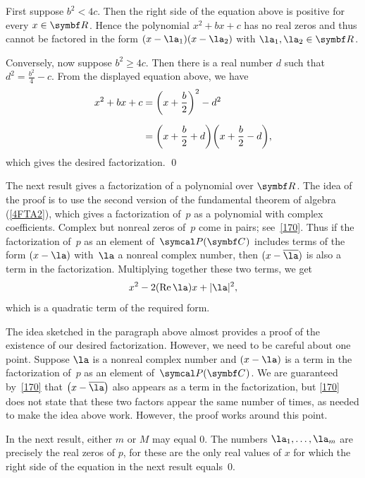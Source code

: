 
First suppose $b^2 < 4 c$.  Then the right side of the
equation above is positive for every $x \in \R{}$. Hence the polynomial
$x^2 + b x + c$ has no real zeros and thus cannot be factored in the form
$(x - \la_1)(x - \la_2)$ with $\la_1, \la_2 \in \R{}$.

\pagebreak[3]

Conversely, now suppose $b^2 \ge 4 c$.  Then there is a real
number $d$ such that $d^2 = \frac{b^2}{4} - c$.  From the displayed equation above, we
have
\begin{align*}
x^2 + b x + c &= \paren[\bigg]{x + \frac{b}{2}}^2 - d^2 \\[6bp]
&= \paren[\bigg]{x + \frac{b}{2} + d} \paren[\bigg]{x + \frac{b}{2} - d},
\end{align*}
which gives the desired factorization.
\qed

The next result gives a factorization of a polynomial over $\R{}$. The idea of the
proof is to use the second version of the fundamental theorem of algebra (\ref{4FTA2}), which gives a factorization of~$p$ as a polynomial with complex coefficients.  Complex but nonreal zeros of~$p$ come in pairs; see~\ref{170}.  Thus
if the factorization of~$p$ as an element of~$\P(\C{})$ includes terms of the form
$(x - \la)$ with~$\la$ a nonreal complex number, then $(x - \bar{\la})$ is also a
term in the factorization.  Multiplying together these two terms, we get
\[
x^2 - 2(\re \la)x + |\la|^2,
\]
which is a quadratic term of the required form.


The idea sketched in the paragraph above almost provides a proof of the
existence of our desired factorization.  However, we need to be careful about one
point.  Suppose $\la$ is a nonreal complex number and $(x - \la)$ is a term in the
factorization of~$p$ as an element of~$\P(\C{})$.  We are guaranteed by~\ref{170}
that $\paren[\big]{x - \bar{\la}}$ also appears as a term in the factorization, but \ref{170} does
not state that these two factors appear the same number of times, as needed to
make the idea above work.  However, the proof works around this point.

In the next result, either $m$ or $M$ may equal $0$. The
numbers $\la_1, \dots, \la_m$ are precisely the real zeros of $p$, for these
are the only real values of $x$ for which the right side of the equation in the next result
equals~$0$.


